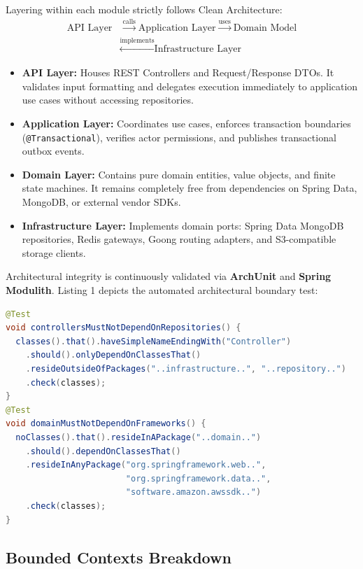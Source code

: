 \documentclass[conference,10pt,a4paper]{IEEEtran}
\begin{document}
Layering within each module strictly follows Clean Architecture:
\begin{equation}
\begin{aligned}
\text{API Layer} &\xrightarrow{\text{calls}} \text{Application Layer} \xrightarrow{\text{uses}} \text{Domain Model} \\
&\xleftarrow{\text{implements}} \text{Infrastructure Layer}
\end{aligned}
\end{equation}

\begin{itemize}
    \item \textbf{API Layer:} Houses REST Controllers and Request/Response DTOs. It validates input formatting and delegates execution immediately to application use cases without accessing repositories.
    \item \textbf{Application Layer:} Coordinates use cases, enforces transaction boundaries (\texttt{@Transactional}), verifies actor permissions, and publishes transactional outbox events.
    \item \textbf{Domain Layer:} Contains pure domain entities, value objects, and finite state machines. It remains completely free from dependencies on Spring Data, MongoDB, or external vendor SDKs.
    \item \textbf{Infrastructure Layer:} Implements domain ports: Spring Data MongoDB repositories, Redis gateways, Goong routing adapters, and S3-compatible storage clients.
\end{itemize}

Architectural integrity is continuously validated via \textbf{ArchUnit} and \textbf{Spring Modulith}. Listing 1 depicts the automated architectural boundary test:
\begin{lstlisting}[language=Java,caption={Automated Architectural Verification via ArchUnit}]
@Test
void controllersMustNotDependOnRepositories() {
  classes().that().haveSimpleNameEndingWith("Controller")
    .should().onlyDependOnClassesThat()
    .resideOutsideOfPackages("..infrastructure..", "..repository..")
    .check(classes);
}
@Test
void domainMustNotDependOnFrameworks() {
  noClasses().that().resideInAPackage("..domain..")
    .should().dependOnClassesThat()
    .resideInAnyPackage("org.springframework.web..", 
                        "org.springframework.data..", 
                        "software.amazon.awssdk..")
    .check(classes);
}
\end{lstlisting}

\subsection{Bounded Contexts Breakdown}
\end{document}
